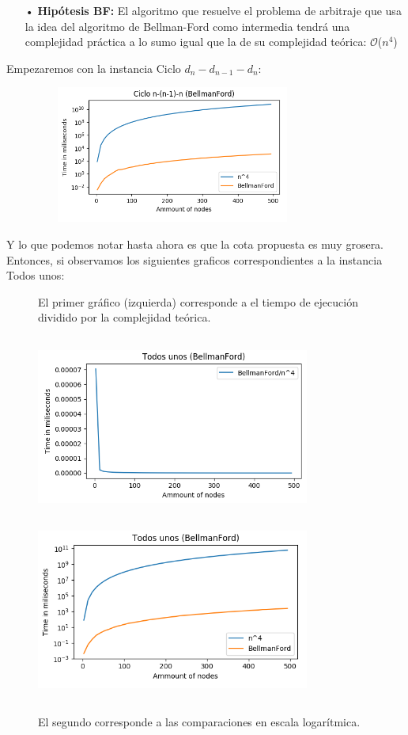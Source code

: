 \documentclass[11pt,a4paper]{article}
\begin{document}
\begin{itemize}
    \item[•] \textbf{Hip\'otesis BF:} El algoritmo que resuelve el problema de arbitraje que usa la idea del algoritmo de Bellman-Ford como intermedia tendr\'a una complejidad pr\'actica a lo sumo igual que la de su complejidad te\'orica: $\mathcal{O}$($n^{4}$)
\end{itemize}
Empezaremos con la instancia Ciclo $d_{n}-d_{n-1}-d_{n}$:
\begin{figure}[h]
    \centering
    \includegraphics[height = 4.5cm,width = 9cm]{BFlog-nnl1n.png}
\end{figure}
\pagebreak

Y lo que podemos notar hasta ahora es que la cota propuesta es muy grosera. Entonces, si observamos los siguientes graficos correspondientes a la instancia Todos unos:

\begin{figure}[h]
    \caption{El primer gr\'afico (izquierda) corresponde a el tiempo de ejecuci\'on dividido por la complejidad te\'orica.}
    \caption{El segundo corresponde a las comparaciones en escala logar\'itmica.}
    \includegraphics[height = 6cm,width = 9cm]{B-F4unos.png}
    \includegraphics[height = 6cm,width = 9cm]{BFlog-unos.png}
\end{figure}
\end{document}

